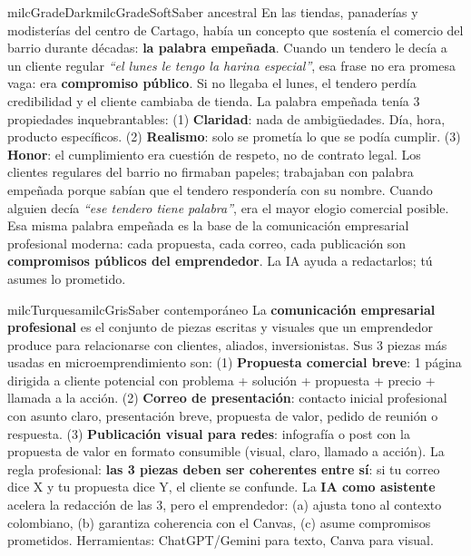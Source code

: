 \documentclass[11pt,letterpaper]{article}
\begin{document}
\begin{softbox}{milcGradeDark}{milcGradeSoft}{Saber ancestral}
En las tiendas, panaderías y modisterías del centro de Cartago, había un concepto que sostenía el comercio del barrio durante décadas: \textbf{la palabra empeñada}. Cuando un tendero le decía a un cliente regular \emph{``el lunes le tengo la harina especial''}, esa frase no era promesa vaga: era \textbf{compromiso público}. Si no llegaba el lunes, el tendero perdía credibilidad y el cliente cambiaba de tienda. La palabra empeñada tenía 3 propiedades inquebrantables: (1) \textbf{Claridad}: nada de ambigüedades. Día, hora, producto específicos. (2) \textbf{Realismo}: solo se prometía lo que se podía cumplir. (3) \textbf{Honor}: el cumplimiento era cuestión de respeto, no de contrato legal. Los clientes regulares del barrio no firmaban papeles; trabajaban con palabra empeñada porque sabían que el tendero respondería con su nombre. Cuando alguien decía \emph{``ese tendero tiene palabra''}, era el mayor elogio comercial posible. Esa misma palabra empeñada es la base de la comunicación empresarial profesional moderna: cada propuesta, cada correo, cada publicación son \textbf{compromisos públicos del emprendedor}. La IA ayuda a redactarlos; tú asumes lo prometido.
\end{softbox}

\begin{softbox}{milcTurquesa}{milcGris}{Saber contemporáneo}
La \textbf{comunicación empresarial profesional} es el conjunto de piezas escritas y visuales que un emprendedor produce para relacionarse con clientes, aliados, inversionistas. Sus 3 piezas más usadas en microemprendimiento son: (1) \textbf{Propuesta comercial breve}: 1 página dirigida a cliente potencial con problema + solución + propuesta + precio + llamada a la acción. (2) \textbf{Correo de presentación}: contacto inicial profesional con asunto claro, presentación breve, propuesta de valor, pedido de reunión o respuesta. (3) \textbf{Publicación visual para redes}: infografía o post con la propuesta de valor en formato consumible (visual, claro, llamado a acción). La regla profesional: \textbf{las 3 piezas deben ser coherentes entre sí}: si tu correo dice X y tu propuesta dice Y, el cliente se confunde. La \textbf{IA como asistente} acelera la redacción de las 3, pero el emprendedor: (a) ajusta tono al contexto colombiano, (b) garantiza coherencia con el Canvas, (c) asume compromisos prometidos. Herramientas: ChatGPT/Gemini para texto, Canva para visual.
\end{softbox}
\end{document}
